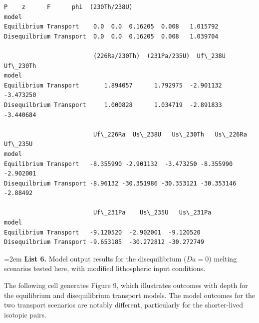 \documentclass[draft]{agujournal2019}
\makeatletter
\newcommand{\boxspacing}{\kern\kvtcb@left@rule\kern\kvtcb@boxsep}
\newcommand{\prompt}[4]{
        \ttfamily\llap{{\color{#2}[#3]:\hspace{3pt}#4}}\vspace{-\baselineskip}
    }
\makeatother
\begin{document}
            \begin{tcolorbox}[breakable, size=fbox, boxrule=.5pt, pad at break*=1mm, opacityfill=0]
\prompt{Out}{outcolor}{28}{\boxspacing}
\begin{Verbatim}[commandchars=\\\{\}]
                          P    z      F      phi  (230Th/238U)
model
Equilibrium Transport    0.0  0.0  0.16205  0.008   1.015792
Disequilbrium Transport  0.0  0.0  0.16205  0.008   1.039704

                         (226Ra/230Th)  (231Pa/235U)  Uf\_238U  Uf\_230Th
model
Equilibrium Transport       1.894057      1.792975  -2.901132  -3.473250
Disequilbrium Transport     1.000828      1.034719  -2.891833  -3.440684

                         Uf\_226Ra  Us\_238U   Us\_230Th   Us\_226Ra   Uf\_235U
model
Equilibrium Transport   -8.355990 -2.901132  -3.473250 -8.355990 -2.902001
Disequilbrium Transport -8.96132 -30.351986 -30.353121 -30.353146 -2.88492

                         Uf\_231Pa    Us\_235U   Us\_231Pa
model
Equilibrium Transport   -9.120520  -2.902001  -9.120520
Disequilbrium Transport -9.653185  -30.272812 -30.272749
\end{Verbatim}
\end{tcolorbox}
        
\hangindent=2em
    \textbf{List 6.} Model output results for the disequilibrium ($Da = 0$) melting scenarios tested here, with modified lithospheric input conditions.

\bigskip

The following cell generates Figure 9, which illustrates outcomes with depth for the equilibrium and disequilibrium transport models. The model outcomes for the two transport scenarios are notably different, particularly for the shorter-lived isotopic pairs.
\end{document}
